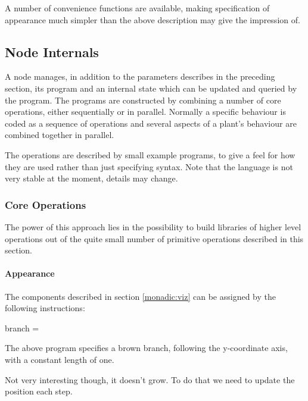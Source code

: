     A number of convenience functions are available, making
    specification of appearance much simpler than the above
    description may give the impression of.


\subsection{Node Internals}

\label{monadic:node_internals}

    A node manages, in addition to the parameters describes in the
    preceding section, its program and an internal state which can be
    updated and queried by the program. The programs are constructed
    by combining a number of core operations, either sequentially or
    in parallel. Normally a specific behaviour is coded as a sequence
    of operations and several aspects of a plant's behaviour are
    combined together in parallel.

    The operations are described by small example programs, to give a
    feel for how they are used rather than just specifying syntax.
    Note that the language is not very stable at the moment, details
    may change.


\subsubsection{Core Operations}

    The power of this approach lies in the possibility to build
    libraries of higher level operations out of the quite small number
    of primitive operations described in this section. 

\paragraph{Appearance}

    The components described in section \ref{monadic:viz} can be
    assigned by the following instructions:

\begin{haskell*}
branch = 
\end{haskell*}
The above program specifies a brown branch, following the
y-coordinate axis, with a constant length of one.

Not very interesting though, it doesn't grow. To do that we need to
update the position each step.

